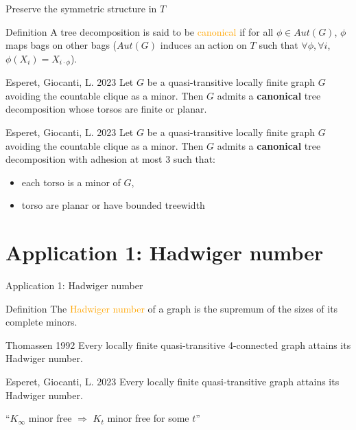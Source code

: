 \documentclass[11pt,dvipsnames,presentation,aspectratio=169]{beamer}
\newcommand{\myorange}{Orange}
\newcommand{\define}[1]{\textcolor{\myorange}{#1}}
\begin{document}
\begin{frame}{Preserve the symmetric structure in $T$}
  \begin{exampleblock}{Definition}
    A tree decomposition is said to be \define{canonical} if for all $\phi \in Aut(G)$,
    $\phi$ maps bags on other bags ($Aut(G)$ induces an action on $T$ such that
    $\forall \phi, \forall i$, $\phi(X_i) = X_{i\cdot\phi}$).
  \end{exampleblock}
  
  \pause
  \begin{block}{Esperet, Giocanti, L. 2023}
    Let $G$ be a quasi-transitive locally finite graph $G$ avoiding the
    countable clique as a minor. Then $G$ admits a {\bf canonical} tree
    decomposition whose torsos are finite or planar.
  \end{block}

  \pause
  \begin{block}{Esperet, Giocanti, L. 2023}
    Let $G$ be a quasi-transitive locally finite graph $G$ avoiding the
    countable clique as a minor. Then $G$ admits a {\bf canonical} tree
    decomposition with adhesion at most 3 such that:
    \begin{itemize}
    \item each torso is a minor of $G$,
    \item torso are planar or have bounded treewidth
    \end{itemize}
  \end{block}
\end{frame}

\section*{Application 1: Hadwiger number}
\begin{frame}{Application 1: Hadwiger number}
  \begin{exampleblock}{Definition}
    The \define{Hadwiger number} of a graph is the supremum of the sizes of its complete minors.
  \end{exampleblock}

  \begin{block}{Thomassen 1992}
    Every locally finite quasi-transitive 4-connected graph attains its Hadwiger number.
  \end{block}

  \begin{block}{Esperet, Giocanti, L. 2023}
    Every locally finite quasi-transitive graph attains its Hadwiger number.
  \end{block}

  \centering
  ``$K_\infty$ minor free $\Rightarrow$ $K_t$ minor free for some $t$''
\end{frame}
\end{document}
